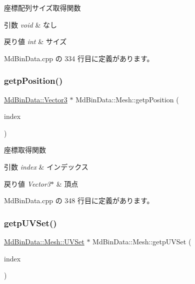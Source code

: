 座標配列サイズ取得関数 


\begin{DoxyParams}{引数}
{\em void} & なし \\
\hline
\end{DoxyParams}

\begin{DoxyRetVals}{戻り値}
{\em int} & サイズ \\
\hline
\end{DoxyRetVals}


 Md\+Bin\+Data.\+cpp の 334 行目に定義があります。

\mbox{\label{class_md_bin_data_1_1_mesh_aeac6f04c4285834331a7fd93641dca8e}} 
\subsubsection{\texorpdfstring{getp\+Position()}{getpPosition()}}
{\footnotesize\ttfamily \mbox{\hyperlink{class_md_bin_data_1_1_vector3}{Md\+Bin\+Data\+::\+Vector3}} $\ast$ Md\+Bin\+Data\+::\+Mesh\+::getp\+Position (\begin{DoxyParamCaption}\item[{int}]{index }\end{DoxyParamCaption})}



座標取得関数 


\begin{DoxyParams}{引数}
{\em index} & インデックス \\
\hline
\end{DoxyParams}

\begin{DoxyRetVals}{戻り値}
{\em Vector3$\ast$} & 頂点 \\
\hline
\end{DoxyRetVals}


 Md\+Bin\+Data.\+cpp の 348 行目に定義があります。

\mbox{\label{class_md_bin_data_1_1_mesh_af3ea3dc8ac955dc04bbc5af9112874cd}} 
\subsubsection{\texorpdfstring{getp\+U\+V\+Set()}{getpUVSet()}}
{\footnotesize\ttfamily \mbox{\hyperlink{class_md_bin_data_1_1_mesh_1_1_u_v_set}{Md\+Bin\+Data\+::\+Mesh\+::\+U\+V\+Set}} $\ast$ Md\+Bin\+Data\+::\+Mesh\+::getp\+U\+V\+Set (\begin{DoxyParamCaption}\item[{int}]{index }\end{DoxyParamCaption})}



